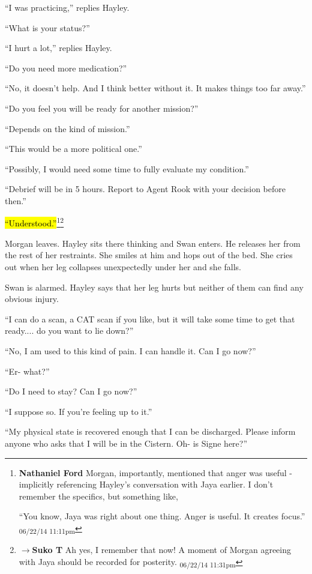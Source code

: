 ``I was practicing,'' replies Hayley.

``What is your status?'' 

``I hurt a lot,'' replies Hayley.

``Do you need more medication?''

``No, it doesn't help.  And I think better without it.  It makes things too far away.''

``Do you feel you will be ready for another mission?''

``Depends on the kind of mission.''

``This would be a more political one.''

``Possibly, I would need some time to fully evaluate my condition.''

``Debrief will be in 5 hours.  Report to Agent Rook with your decision before then.''

\hl{``Understood.''}\footnote{\textbf{Nathaniel Ford }Morgan, importantly, mentioned that anger was useful - implicitly referencing Hayley's conversation with Jaya earlier. I don't remember the specifics, but something like,

``You know, Jaya was right about one thing. Anger is useful. It creates focus.'' \textsubscript{06/22/14 11:11pm}}\footnote{$\rightarrow$\textbf{Suko T }Ah yes, I remember that now!  A moment of Morgan agreeing with Jaya should be recorded for posterity. \textsubscript{06/22/14 11:31pm}}



Morgan leaves.  Hayley sits there thinking and Swan enters.  He releases her from the rest of her restraints.  She smiles at him and hops out of the bed.  She cries out when her leg collapses unexpectedly under her and she falls.

Swan is alarmed.  Hayley says that her leg hurts but neither of them can find any obvious injury.

``I can do a scan, a CAT scan if you like, but it will take some time to get that ready.... do you want to lie down?''

``No, I am used to this kind of pain.  I can handle it.  Can I go now?''

``Er- what?''

``Do I need to stay?  Can I go now?''

``I suppose so.  If you're feeling up to it.''

``My physical state is recovered enough that I can be discharged.  Please inform anyone who asks that I will be in the Cistern.  Oh- is Signe here?''

